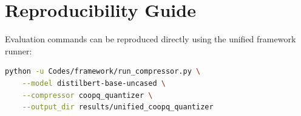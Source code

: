 \section{Reproducibility Guide}
Evaluation commands can be reproduced directly using the unified framework runner:
\begin{lstlisting}[language=bash]
python -u Codes/framework/run_compressor.py \
    --model distilbert-base-uncased \
    --compressor coopq_quantizer \
    --output_dir results/unified_coopq_quantizer
\end{lstlisting}
